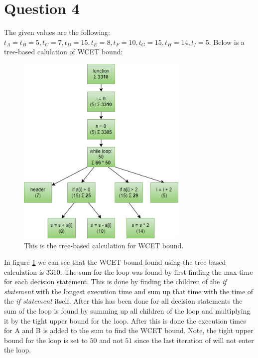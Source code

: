 \section{Question 4}

    The given values are the following: $t_A = t_B = 5, t_C = 7, t_D = 15, t_E = 8, t_F = 10,t_G = 15, t_H = 14, t_I = 5$. Below is a tree-based calulation of WCET bound:

    \begin{figure}[H]
        \centering
        \includegraphics[height=350px]{images/Ass3Q4.png}
        \caption{This is the tree-based calculation for WCET bound.}
        \label{fig:tree}
    \end{figure}
    
    In figure \ref{fig:tree} we can see that the WCET bound found using the tree-based calculation is $3310$. The sum for the loop was found by first finding the max time for each decision statement. This is done by finding the children of the \textit{if statement} with the longest execution time and sum up that time with the time of the \textit{if statement} itself. After this has been done for all decision statements the sum of the loop is found by summing up all children of the loop and multiplying it by the tight upper bound for the loop. After this is done the execution times for A and B is added to the sum to find the WCET bound. Note, the tight upper bound for the loop is set to $50$ and not $51$ since the last iteration of will not enter the loop.